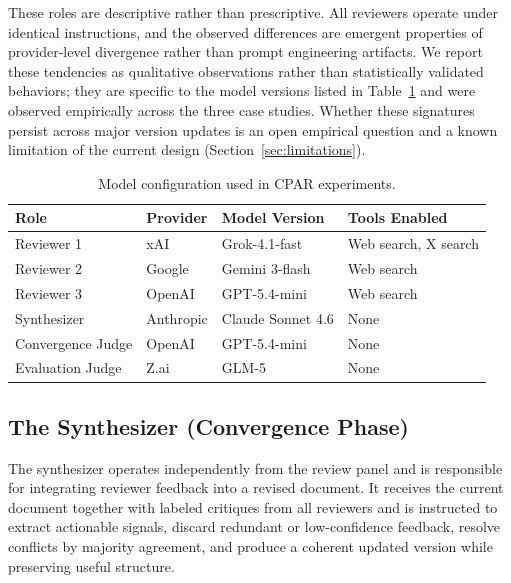 \documentclass[11pt, a4paper]{article}
\begin{document}
These roles are descriptive rather than prescriptive. All reviewers operate under identical instructions, and the observed differences are emergent properties of provider-level divergence rather than prompt engineering artifacts. We report these tendencies as qualitative observations rather than statistically validated behaviors; they are specific to the model versions listed in Table~\ref{tab:models} and were observed empirically across the three case studies. Whether these signatures persist across major version updates is an open empirical question and a known limitation of the current design (Section~\ref{sec:limitations}).

\begin{table}[h]
\centering
\caption{Model configuration used in CPAR experiments.}
\label{tab:models}
\begin{tabular}{@{}llll@{}}
\toprule
\textbf{Role} & \textbf{Provider} & \textbf{Model Version} & \textbf{Tools Enabled} \\ \midrule
Reviewer 1        & xAI       & Grok-4.1-fast       & Web search, X search \\
Reviewer 2        & Google    & Gemini 3-flash      & Web search \\
Reviewer 3        & OpenAI    & GPT-5.4-mini        & Web search \\
Synthesizer       & Anthropic & Claude Sonnet 4.6   & None \\
Convergence Judge & OpenAI    & GPT-5.4-mini        & None \\
Evaluation Judge  & Z.ai      & GLM-5               & None \\ \bottomrule
\end{tabular}
\end{table}

\subsection{The Synthesizer (Convergence Phase)}

The synthesizer operates independently from the review panel and is responsible for integrating reviewer feedback into a revised document. It receives the current document together with labeled critiques from all reviewers and is instructed to extract actionable signals, discard redundant or low-confidence feedback, resolve conflicts by majority agreement, and produce a coherent updated version while preserving useful structure.
\end{document}
